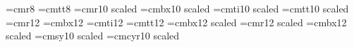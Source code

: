 

   












 
\nopagenumbers

\font\small=cmr8
\font\smalltt=cmtt8
\font\medium=cmr10 scaled \magstephalf
\font\mediumbx=cmbx10 scaled \magstephalf
\font\mediumit=cmti10 scaled \magstephalf
\font\mediumtt=cmtt10 scaled \magstephalf
\font\large=cmr12
\font\largebx=cmbx12
\font\largeit=cmti12
\font\largett=cmtt12
\font\Largebx=cmbx12 scaled \magstephalf
\font\huge=cmr12 scaled 
\font\hugebx=cmbx12 scaled 
\font\mediumsy=cmsy10 scaled \magstephalf
\font\mediumcy=cmcyr10 scaled \magstephalf

